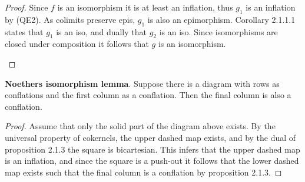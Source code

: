     \begin{proof}
        Since $f$ is an isomorphism it is at least an inflation, thus $g_1$ is an inflation by (QE2). As colimits preserve epis, $g_1$ is also an epimorphism. Corollary 2.1.1.1 states that $g_1$ is an iso, and dually that $g_2$ is an iso. Since isomorphisms are closed under composition it follows that $g$ is an isomorphism. 
        \begin{center}
        \end{center}
    \end{proof}

    \begin{lemma}
        \textbf{Noethers isomorphism lemma}. Suppose there is a diagram with rows as conflations and the first column as a conflation. Then the final column is also a conflation.
        \begin{center}
        \end{center}
    \end{lemma}

    \begin{proof}
        Assume that only the solid part of the diagram above exists. By the universal property of cokernels, the upper dashed map exists, and by the dual of proposition 2.1.3 the square is bicartesian. This infers that the upper dashed map is an inflation, and since the square is a push-out it follows that the lower dashed map exists such that the final column is a conflation by proposition 2.1.3.
    \end{proof}

